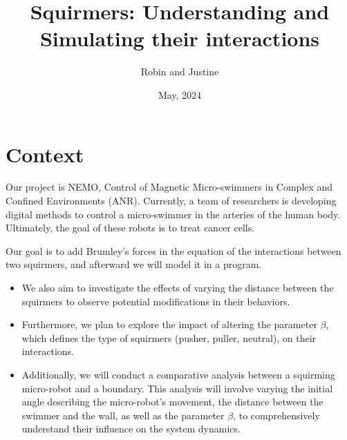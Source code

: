 \documentclass[options]{article}
\begin{document}
\title{Squirmers: Understanding and Simulating their interactions}
\author{Robin and Justine}
\date{May, 2024}
\maketitle

\section{Context}
Our project is NEMO, Control of Magnetic Micro-swimmers in Complex and Confined Environments (ANR).
Currently, a team of researchers is developing digital methods to control a micro-swimmer in the arteries
of the human body.
Ultimately, the goal of these robots is to treat cancer cells.

\vspace{0.5cm}
Our goal is to add Brumley's forces in the equation of the interactions between two squirmers, 
and afterward we will model it in a program. 
\begin{itemize}
    \item We also aim to investigate the effects of varying the distance between the squirmers to observe
    potential modifications in their behaviors.
    \item Furthermore, we plan to explore the impact of altering the parameter $\beta$, which defines the
    type of squirmers (pusher, puller, neutral), on their interactions.
    \item Additionally, we will conduct a comparative analysis between a squirming micro-robot and a 
    boundary. This analysis will involve varying the initial angle describing the micro-robot's 
    movement, the distance between the swimmer and the wall, as well as the parameter $\beta$, 
    to comprehensively understand their influence on the system dynamics.
\end{itemize}



\nocite{*}


\end{document}
